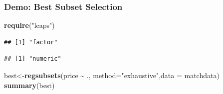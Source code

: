 \documentclass[
  shownotes,
  xcolor={svgnames},
  hyperref={colorlinks,citecolor=DarkBlue,linkcolor=DarkRed,urlcolor=DarkBlue}
  , aspectratio=169]{beamer}
\newenvironment{Shaded}{\begin{snugshade}}{\end{snugshade}}
\newcommand{\DataTypeTok}[1]{\textcolor[rgb]{0.13,0.29,0.53}{#1}}
\newcommand{\KeywordTok}[1]{\textcolor[rgb]{0.13,0.29,0.53}{\textbf{#1}}}
\newcommand{\NormalTok}[1]{#1}
\newcommand{\OperatorTok}[1]{\textcolor[rgb]{0.81,0.36,0.00}{\textbf{#1}}}
\newcommand{\StringTok}[1]{\textcolor[rgb]{0.31,0.60,0.02}{#1}}
\begin{document}
\begin{frame}[fragile]
\frametitle{Demo: Best Subset Selection}
\begin{Shaded}
\begin{Highlighting}[]
\KeywordTok{require}\NormalTok{(}\StringTok{"leaps"}\NormalTok{)}
\end{Highlighting}
\end{Shaded}

\begin{scriptsize}
\begin{Shaded}
\end{Shaded}

\begin{verbatim}
## [1] "factor"
\end{verbatim}

\begin{Shaded}
\end{Shaded}

\begin{verbatim}
## [1] "numeric"
\end{verbatim}
\begin{Shaded}
\end{Shaded}

\begin{Shaded}
\begin{Highlighting}[]
\NormalTok{best\textless{}{-}}\KeywordTok{regsubsets}\NormalTok{(price }\OperatorTok{\textasciitilde{}}\StringTok{ }\NormalTok{., }\DataTypeTok{method=}\StringTok{"exhaustive"}\NormalTok{,}\DataTypeTok{data =}\NormalTok{ matchdata)}
\KeywordTok{summary}\NormalTok{(best)}
\end{Highlighting}
\end{Shaded}
\end{scriptsize}

\end{frame}
\end{document}
